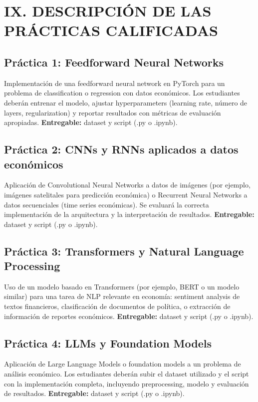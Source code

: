 \documentclass[11pt,a4paper]{article}
\begin{document}
\section*{IX. DESCRIPCI\'ON DE LAS PR\'ACTICAS CALIFICADAS}

\subsection*{Pr\'actica 1: Feedforward Neural Networks}
Implementaci\'on de una feedforward neural network en PyTorch para un problema de classification o regression con datos econ\'omicos. Los estudiantes deber\'an entrenar el modelo, ajustar hyperparameters (learning rate, n\'umero de layers, regularization) y reportar resultados con m\'etricas de evaluaci\'on apropiadas. \textbf{Entregable:} dataset y script (.py o .ipynb).

\subsection*{Pr\'actica 2: CNNs y RNNs aplicados a datos econ\'omicos}
Aplicaci\'on de Convolutional Neural Networks a datos de im\'agenes (por ejemplo, im\'agenes satelitales para predicci\'on econ\'omica) o Recurrent Neural Networks a datos secuenciales (time series econ\'omicas). Se evaluar\'a la correcta implementaci\'on de la arquitectura y la interpretaci\'on de resultados. \textbf{Entregable:} dataset y script (.py o .ipynb).

\subsection*{Pr\'actica 3: Transformers y Natural Language Processing}
Uso de un modelo basado en Transformers (por ejemplo, BERT o un modelo similar) para una tarea de NLP relevante en econom\'ia: sentiment analysis de textos financieros, clasificaci\'on de documentos de pol\'itica, o extracci\'on de informaci\'on de reportes econ\'omicos. \textbf{Entregable:} dataset y script (.py o .ipynb).

\subsection*{Pr\'actica 4: LLMs y Foundation Models}
Aplicaci\'on de Large Language Models o foundation models a un problema de an\'alisis econ\'omico. Los estudiantes deber\'an subir el dataset utilizado y el script con la implementaci\'on completa, incluyendo preprocessing, modelo y evaluaci\'on de resultados. \textbf{Entregable:} dataset y script (.py o .ipynb).
\end{document}
